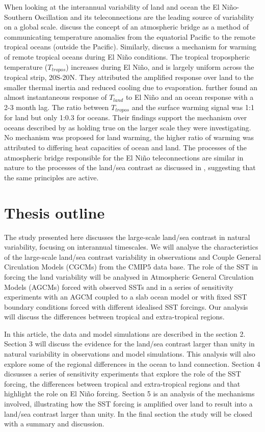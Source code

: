 When looking at the interannual variability of land and ocean the El 
Ni{\~n}o-Southern Oscillation and its teleconnections are the leading source of 
variability on a global scale. \citet*{Klein1999} discuss the concept of an 
atmospheric bridge as a method of communicating temperature anomalies from the 
equatorial Pacific to the remote tropical oceans (outside the Pacific).  
Similarly, \citet*{Chiang2002} discuss a mechanism for warming of remote 
tropical oceans during El Ni{\~n}o conditions. The tropical tropospheric 
temperature ($T_{tropos}$) increases during El Ni{\~n}o, and is largely uniform 
across the tropical strip, 20S-20N.  They attributed the amplified response over 
land to the smaller thermal inertia and reduced cooling due to evaporation.  
\citet*{Chiang2005} further found an almost instantaneous response of $T_{land}$ 
to  El Ni{\~n}o and an ocean response with a 2-3 month lag.  The ratio between 
$T_{tropos}$ and the surface warming signal was 1:1 for land but only 1:0.3 for 
oceans.  Their findings support the mechanism over oceans described by 
\citet*{Chiang2002} as holding true on the larger scale they were investigating.  
No mechanism was proposed for land warming, the higher ratio of warming was 
attributed to differing heat capacities of ocean and land. The processes of the 
atmospheric bridge responsible for the El Ni{\~n}o teleconnections are similar 
in nature to the processes of the land/sea contrast as discussed in 
\citet{Joshi2008}, suggesting that the same principles are active.

\section{Thesis outline}

The study presented here discusses the large-scale land/sea contrast in natural 
variability, focusing on interannual timescales. We will analyse the 
characteristics of the large-scale land/sea contrast variability in observations 
and Couple General Circulation Models (CGCMs) from the CMIP5 data base. The role 
of the SST in forcing the land variability will be analysed in Atmospheric 
General Circulation Models (AGCMs) forced with observed SSTs and in a series of 
sensitivity experiments with an AGCM coupled to a slab ocean model or with fixed 
SST boundary conditions forced with different idealised SST forcings.  Our 
analysis will discuss the differences between tropical and extra-tropical 
regions.

In this article, the data and model simulations are described in the section 
2. Section 3 will discuss the evidence for the land/sea contrast larger than
unity in natural variability in observations and model simulations. This 
analysis will also explore some of the regional differences in the ocean to land 
connection. Section 4 dicsusses a series of sensitivity experiments that explore 
the role of the SST forcing, the differences between tropical and extra-tropical 
regions and that highlight the role on El Ni{\~n}o forcing.  Section 5 is an 
analysis of the mechanisms involved, illustrating how the SST forcing is 
amplified over land to result into a land/sea contrast larger than unity. In the 
final section the study will be closed with a summary and discussion.

\processdelayedfloats
\setcounter{postfig}{0}
\setcounter{posttbl}{0}

